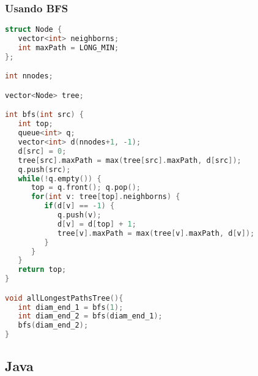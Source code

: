 \subsubsection{Usando BFS}
\begin{lstlisting}[language=C++]
struct Node {
   vector<int> neighborns;
   int maxPath = LONG_MIN;
};

int nnodes;

vector<Node> tree;

int bfs(int src) {
   int top;
   queue<int> q;
   vector<int> d(nnodes+1, -1);
   d[src] = 0;
   tree[src].maxPath = max(tree[src].maxPath, d[src]);
   q.push(src);
   while(!q.empty()) {
      top = q.front(); q.pop();
      for(int v: tree[top].neighborns) {
         if(d[v] == -1) {
            q.push(v);
            d[v] = d[top] + 1;
            tree[v].maxPath = max(tree[v].maxPath, d[v]);
         }
      }
   }
   return top;
}

void allLongestPathsTree(){
   int diam_end_1 = bfs(1);
   int diam_end_2 = bfs(diam_end_1);
   bfs(diam_end_2);
}
\end{lstlisting}

\subsection{Java}

